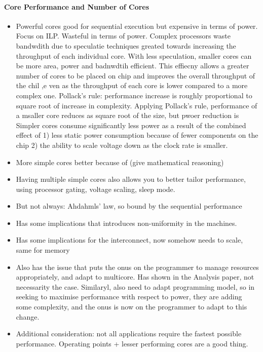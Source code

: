 \paragraph{Core Performance and Number of Cores}
\begin{itemize}
\item Powerful cores good for sequential execution but expensive
in terms of power. Focus on ILP. Wasteful in terms of power. 
Complex processors waste bandwdith due to 
speculatie techniques greated towards increasing the throughput
of each individual core. With less speculation, smaller cores can be more
area, power and badnwdtih efficient. This effiecny allows
a greater number of cores to be placed on chip and improves the overall
throughput of the chil ,e ven as the throughput of each core is lower compared to a more 
complex one. Pollack's rule: performance increase is roughly proportional to square root 
of increase in complexity. Applying Pollack's rule, 
performance of a msaller core reduces as square root of the size, but pwoer reduction is 
Simpler cores consume significantly less power as
a result of the combined effect of 1) less static power consumption because 
of fewer components on the chip 2) the ability to scale voltage down as
the clock rate is smaller.
\item More simple cores better because of (give mathematical reasoning)
\item Having multiple simple cores also allows you to better tailor
performance, using processor gating, voltage scaling, sleep mode. 
\item But not always: Ahdahmls' law, so bound by the sequential performance
\item Has some implications that introduces non-uniformity in the machines. 
\item Has some implications for the interconnect, now somehow needs to scale,
same for memory 
\item Also has the issue that puts the onus on the programmer to manage 
resources appropriately, and adapt to multicore. Has shown in 
the Analysis paper, not necessarity the case. Similaryl, 
also need to adapt programming model, so in seeking to maximise 
performance with respect to power, they are adding some complexity, 
and the onus is now on the programmer to adapt to this change. 
\item Additional consideration: not all applications require the fastest
possible performance. Operating points + lesser performing cores
are a good thing. 
\end{itemize}
